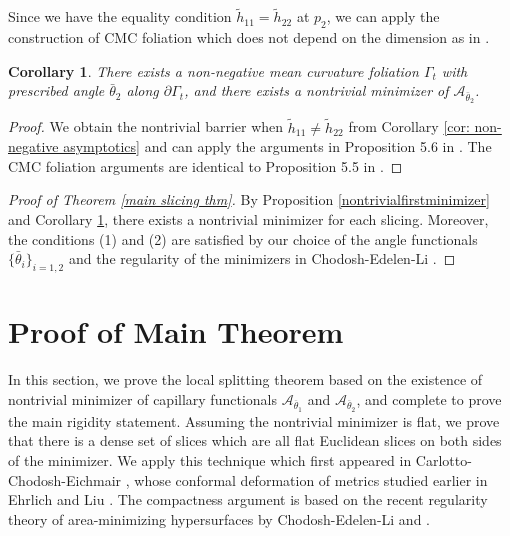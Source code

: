 \documentclass[11pt,letterpaper]{amsart}
\newtheorem{cor}{Corollary}[section]
\begin{document}
Since we have the equality condition $\tilde{h}_{11} = \tilde{h}_{22}$ at $p_{2}$, we can apply the construction of CMC foliation which does not depend on the dimension as in \cite{koyao}.
\begin{cor} \label{nontrivialsecondminimizer}
    There exists a non-negative mean curvature foliation $\Gamma_t$ with prescribed angle $\bar{\theta}_2$ along $\partial\Gamma_t$, and there exists a nontrivial minimizer of $\mathcal A_{\bar{\theta}_2}$.
\end{cor}
\begin{proof}
    We obtain the nontrivial barrier when $\tilde{h}_{11} \neq \tilde{h}_{22}$ from Corollary \ref{cor: non-negative asymptotics} and can apply the arguments in Proposition 5.6 in \cite{koyao}. The CMC foliation arguments are identical to Proposition 5.5 in \cite{koyao}.
\end{proof}
\begin{proof}[Proof of Theorem \ref{main slicing thm}] By Proposition  \ref{nontrivialfirstminimizer} and Corollary \ref{nontrivialsecondminimizer}, there exists a nontrivial minimizer for each slicing. Moreover, the conditions (1) and (2) are satisfied by our choice of the angle functionals $\{ \bar{\theta}_{i}\}_{i=1,2}$ and the regularity of the minimizers in Chodosh-Edelen-Li \cite{chodosh2024improved}.
\end{proof}



\section{Proof of Main Theorem}
In this section, we prove the local splitting theorem based on the existence of nontrivial minimizer of capillary functionals $\mathcal{A}_{\overline{\theta}_{1}}$ and $\mathcal{A}_{\overline{\theta}_{2}}$, and complete to prove the main rigidity statement. Assuming the nontrivial minimizer is flat, we prove that there is a dense set of slices which are all flat Euclidean slices on both sides of the minimizer. We apply this technique which first appeared in Carlotto-Chodosh-Eichmair \cite{carlotto2016effective}, whose conformal deformation of metrics studied earlier in Ehrlich \cite{ehrlich1976metric} and Liu \cite{liu20133}. The compactness argument is based on the recent regularity theory of area-minimizing hypersurfaces by Chodosh-Edelen-Li \cite{chodosh2024improved} and \cite{chodosh2025weiss}.
\end{document}
